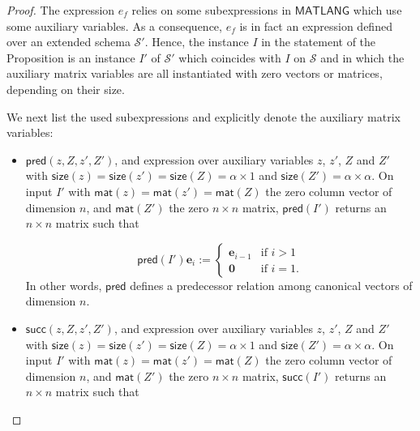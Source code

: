 \begin{proof}
The expression $e_f$ relies on some subexpressions in $\mathsf{MATLANG}$ which use some auxiliary variables. As a consequence, $e_f$ is in fact an expression defined over an extended schema $\mathcal{S}'$. Hence, the instance $I$ in the statement of the Proposition is  an instance $I'$ of $\mathcal{S}'$ which
coincides with $I$ on $\mathcal{S}$ and in which the auxiliary matrix variables are all instantiated with zero vectors or matrices, depending on their size.

We next list the used subexpressions and explicitly denote the auxiliary matrix variables:
\begin{itemize}
	\item $\mathsf{pred}(z,Z,z',Z')$, and expression over auxiliary variables $z$, $z'$, $Z$ and $Z'$ with $\mathsf{size}(z)=\mathsf{size}(z')=\mathsf{size}(Z)=\alpha\times 1$ and $\mathsf{size}(Z')=\alpha\times\alpha$. On input $I'$ with 
	$\mathsf{mat}(z)=\mathsf{mat}(z')=\mathsf{mat}(Z)$ the zero column vector of dimension $n$, and $\mathsf{mat}(Z')$ the zero $n\times n$ matrix,
	 $\mathsf{pred}(I')$ returns an $n\times n$ matrix such that 
	 
	 $$\mathsf{pred}(I')\mathbf{e}_i:=\begin{cases} 
	 \mathbf{e}_{i-1} & \text{if $i>1$}\\
	 \mathbf{0} & \text{if $i=1$}.
	\end{cases}
	$$
	In other words, $\mathsf{pred}$ defines a predecessor relation among canonical vectors of dimension $n$.
	 \item $\mathsf{succ}(z,Z,z',Z')$, and expression over auxiliary variables $z$, $z'$, $Z$ and $Z'$ with $\mathsf{size}(z)=\mathsf{size}(z')=\mathsf{size}(Z)=\alpha\times 1$ and $\mathsf{size}(Z')=\alpha\times\alpha$. On input $I'$ with 
	$\mathsf{mat}(z)=\mathsf{mat}(z')=\mathsf{mat}(Z)$ the zero column vector of dimension $n$, and $\mathsf{mat}(Z')$ the zero $n\times n$ matrix,
	 $\mathsf{succ}(I')$ returns an $n\times n$ matrix such that 
	 

\end{itemize}
\end{proof}
